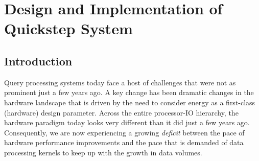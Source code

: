 \chapter{Design and Implementation of Quickstep System}

\section{Introduction}
Query processing systems today face a host of challenges that were not as prominent just a few years ago. A key change has been dramatic changes in the hardware landscape that is driven by the need to consider energy as a first-class (hardware) design parameter. Across the entire processor-IO hierarchy, the hardware paradigm today looks very different than it did just a few years ago. Consequently, we are now experiencing a growing \textit{deficit} between the pace of hardware performance improvements and the pace that is demanded of data processing kernels to keep up with the growth in data volumes.


